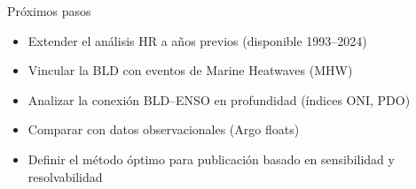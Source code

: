 \documentclass[aspectratio=169, 12pt]{beamer}
\begin{document}
\begin{frame}{Próximos pasos}
\begin{itemize}
  \item Extender el análisis HR a años previos (disponible 1993--2024)
  \item Vincular la BLD con eventos de Marine Heatwaves (MHW)
  \item Analizar la conexión BLD--ENSO en profundidad (índices ONI, PDO)
  \item Comparar con datos observacionales (Argo floats)
  \item Definir el método óptimo para publicación basado en sensibilidad y resolvabilidad
\end{itemize}
\end{frame}
\end{document}
